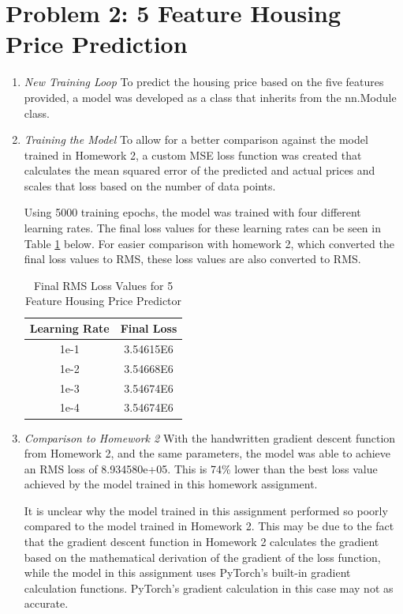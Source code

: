 \documentclass{article}
\begin{document}
    \section{Problem 2: 5 Feature Housing Price Prediction}
    \begin{enumerate}[label=\alph*.]
        \item \textit{New Training Loop}
        To predict the housing price based on the five features provided, a model was developed as a class that inherits from the nn.Module class.
        
        \item \textit{Training the Model}
        To allow for a better comparison against the model trained in Homework 2, a custom MSE loss function was created that calculates the mean squared error of the predicted and actual prices and scales that loss based on the number of data points.

        Using 5000 training epochs, the model was trained with four different learning rates. The final loss values for these learning rates can be seen in Table \ref{tab:house_loss_1} below. For easier comparison with homework 2, which converted the final loss values to RMS, these loss values are also converted to RMS.
    
        \begin{table}[htbp]
            \centering
            \begin{tabular}{|c|c|}
                \hline
                \textbf{Learning Rate} & \textbf{Final Loss} \\
                \hline
                1e-1 & 3.54615E6 \\
                \hline
                1e-2 & 3.54668E6 \\
                \hline
                1e-3 & 3.54674E6 \\
                \hline
                1e-4 & 3.54674E6 \\
                \hline
            \end{tabular}
            \caption{Final RMS Loss Values for 5 Feature Housing Price Predictor}
            \label{tab:house_loss_1}
        \end{table}
    
        \item \textit{Comparison to Homework 2}
        With the handwritten gradient descent function from Homework 2, and the same parameters, the model was able to achieve an RMS loss of 8.934580e+05. This is 74\% lower than the best loss value achieved by the model trained in this homework assignment.
        
        It is unclear why the model trained in this assignment performed so poorly compared to the model trained in Homework 2. This may be due to the fact that the gradient descent function in Homework 2 calculates the gradient based on the mathematical derivation of the gradient of the loss function, while the model in this assignment uses PyTorch's built-in gradient calculation functions. PyTorch's gradient calculation in this case may not as accurate.
        
    
    \end{enumerate}
\end{document}

